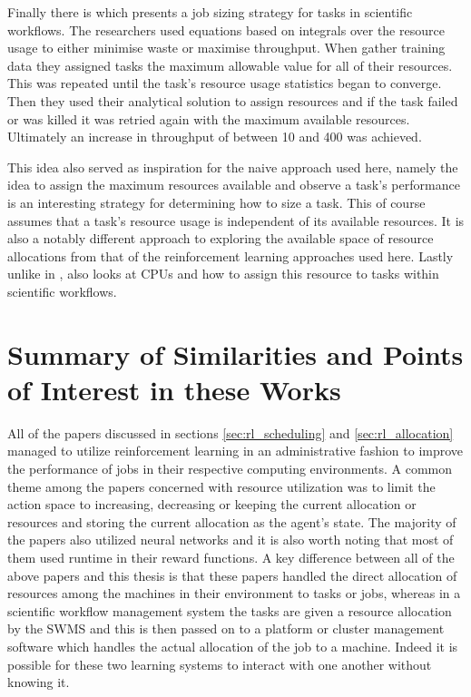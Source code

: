 Finally there is \cite{tovarjob} which presents a job sizing strategy for tasks in scientific workflows. The researchers used equations based on integrals over the resource usage to either minimise waste or maximise throughput. When gather training data they assigned tasks the maximum allowable value for all of their resources. This was repeated until the task’s resource usage statistics began to converge. Then they used their analytical solution to assign resources and if the task failed or was killed it was retried again with the maximum available resources. Ultimately an increase in throughput of between 10 and 400 was achieved.

This idea also served as inspiration for the naive approach used here, namely the idea to assign the maximum resources available and observe a task’s performance is an interesting strategy for determining how to size a task. This of course assumes that a task’s resource usage is independent of its available resources. It is also a notably different approach to exploring the available space of resource allocations from that of the reinforcement learning approaches used here. Lastly unlike in \cite{FeedbackBasedAllocation}, \cite{tovarjob} also looks at CPUs and how to assign this resource to tasks within scientific workflows.

\section{Summary of Similarities and Points of Interest in these Works}
\label{sec:takeaways}

All of the papers discussed in sections \ref{sec:rl_scheduling} and \ref{sec:rl_allocation} managed to utilize reinforcement learning in an administrative fashion to improve the performance of jobs in their respective computing environments. A common theme among the papers concerned with resource utilization was to limit the action space to increasing, decreasing or keeping the current allocation or resources and storing the current allocation as the agent’s state. The majority of the papers also utilized neural networks and it is also worth noting that most of them used runtime in their reward functions. A key difference between all of the above papers and this thesis is that these papers handled the direct allocation of resources among the machines in their environment to tasks or jobs, whereas in a scientific workflow management system the tasks are given a resource allocation by the SWMS and this is then passed on to a platform or cluster management software which handles the actual allocation of the job to a machine. Indeed it is possible for these two learning systems to interact with one another without knowing it.

